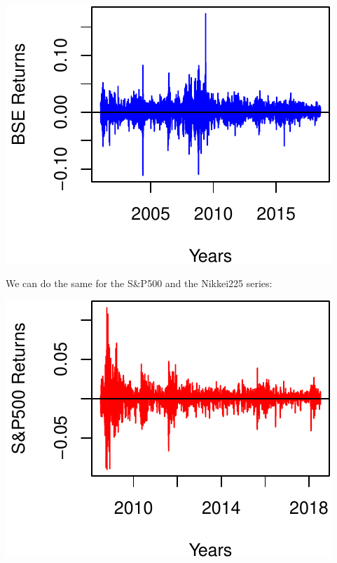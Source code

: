 \documentclass[11pt,]{article}
\newenvironment{Shaded}{\begin{snugshade}}{\end{snugshade}}
\newcommand{\KeywordTok}[1]{\textcolor[rgb]{0.13,0.29,0.53}{\textbf{#1}}}
\newcommand{\DataTypeTok}[1]{\textcolor[rgb]{0.13,0.29,0.53}{#1}}
\newcommand{\DecValTok}[1]{\textcolor[rgb]{0.00,0.00,0.81}{#1}}
\newcommand{\FloatTok}[1]{\textcolor[rgb]{0.00,0.00,0.81}{#1}}
\newcommand{\StringTok}[1]{\textcolor[rgb]{0.31,0.60,0.02}{#1}}
\newcommand{\CommentTok}[1]{\textcolor[rgb]{0.56,0.35,0.01}{\textit{#1}}}
\newcommand{\OperatorTok}[1]{\textcolor[rgb]{0.81,0.36,0.00}{\textbf{#1}}}
\newcommand{\NormalTok}[1]{#1}
\begin{document}
\begin{center}\includegraphics{FMC_T4_PhD_Fin_Time_Series_files/figure-latex/return_market_index-1} \end{center}

We can do the same for the S\&P500 and the Nikkei225 series:

\begin{Shaded}
\end{Shaded}

\begin{center}\includegraphics{FMC_T4_PhD_Fin_Time_Series_files/figure-latex/return_market_index_func-1} \end{center}
\end{document}
